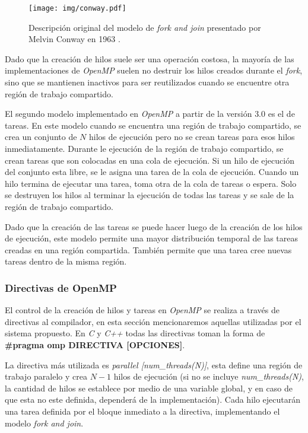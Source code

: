 \begin{figure}[!h]

	\centering

	\texttt{[image: img/conway.pdf]}

	\caption{Descripción original del modelo de \emph{fork and join}
	presentado por Melvin Conway en 1963 \cite{conway1963}.}

	\label{conway}

\end{figure}

Dado que la creación de hilos suele ser una operación costosa, la mayoría de las
implementaciones de \emph{OpenMP} suelen no destruir los hilos creados durante
el \emph{fork}, sino que se mantienen inactivos para ser reutilizados cuando se
encuentre otra región de trabajo compartido.

El segundo modelo implementado en \emph{OpenMP} a partir de la versión $3.0$ es
el de tareas. En este modelo cuando se encuentra una región de trabajo
compartido, se crea un conjunto de $N$ hilos de ejecución pero no se crean
tareas para esos hilos inmediatamente. Durante le ejecución de la región de
trabajo compartido, se crean tareas que son colocadas en una cola de ejecución.
Si un hilo de ejecución del conjunto esta libre, se le asigna una tarea de la
cola de ejecución. Cuando un hilo termina de ejecutar una tarea, toma otra de la
cola de tareas o espera. Solo se destruyen los hilos al terminar la ejecución de
todas las tareas y se sale de la región de trabajo compartido.

Dado que la creación de las tareas se puede hacer luego de la creación de los
hilos de ejecución, este modelo permite una mayor distribución temporal de las
tareas creadas en una región compartida. También permite que una tarea cree
nuevas tareas dentro de la misma región.

\subsubsection{Directivas de OpenMP}

El control de la creación de hilos y tareas en \emph{OpenMP} se realiza a través
de directivas al compilador, en esta sección mencionaremos aquellas utilizadas
por el sistema propuesto. En \emph{C} y \emph{C++} todas las directivas toman la
forma de \textbf{\#pragma omp DIRECTIVA [OPCIONES]}.

La directiva más utilizada es \emph{parallel [num\_threads(N)]}, esta define una
región de trabajo paralelo y crea $N-1$ hilos de ejecución (si no se incluye
\emph{num\_threads(N)}, la cantidad de hilos se establece por medio de una
variable global, y en caso de que esta no este definida, dependerá de la
implementación). Cada hilo ejecutarán una tarea definida por el bloque inmediato
a la directiva, implementando el modelo \emph{fork and join}.

